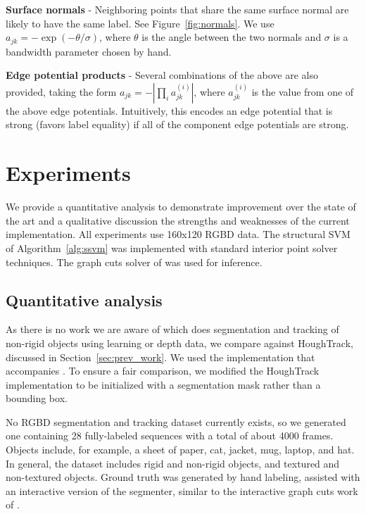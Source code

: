 \documentclass[graybox]{svmult}
\begin{document}
\textbf{Surface normals} - Neighboring points that share the same surface normal are likely to have the same label.  See Figure~\ref{fig:normals}. We use $a_{jk} = - \exp(-\theta / \sigma)$, where $\theta$ is the angle between the two normals and $\sigma$ is a bandwidth parameter chosen by hand.

\textbf{Edge potential products} - Several combinations of the above are also provided, taking the form $a_{jk} = -|\prod_i a^{(i)}_{jk}|$, where $a^{(i)}_{jk}$ is the value from one of the above edge potentials.  Intuitively, this encodes an edge potential that is strong (\ie favors label equality) if all of the component edge potentials are strong.

\section{Experiments}

We provide a quantitative analysis to demonstrate improvement over the state of the art and a qualitative discussion the strengths and weaknesses of the current implementation.  All experiments use 160x120 RGBD data.  The structural SVM of Algorithm~\ref{alg:ssvm} was implemented with standard interior point solver techniques.  The graph cuts solver of \cite{boykov2001a} was used for inference.


\subsection{Quantitative analysis}
\label{sec:quant}

As there is no work we are aware of which does segmentation and tracking of non-rigid objects using learning or depth data, we compare against HoughTrack, discussed in Section~\ref{sec:prev_work}.  We used the implementation that accompanies \cite{godec2011a}.  To ensure a fair comparison, we modified the HoughTrack implementation to be initialized with a segmentation mask rather than a bounding box.

No RGBD segmentation and tracking dataset currently exists, so we generated one containing 28 fully-labeled sequences with a total of about 4000 frames. Objects include, for example, a sheet of paper, cat, jacket, mug, laptop, and hat. In general, the dataset includes rigid and non-rigid objects, and textured and non-textured objects. Ground truth was generated by hand labeling, assisted with an interactive version of the segmenter, similar to the interactive graph cuts work of \cite{boykov2001a}.
\end{document}
